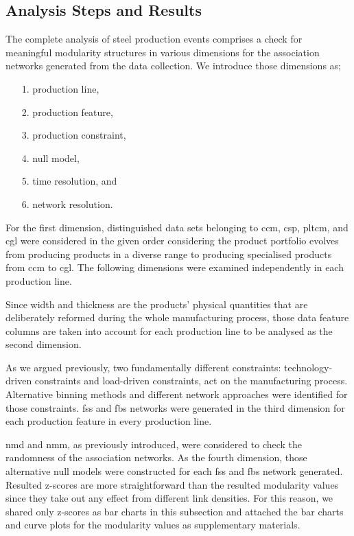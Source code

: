 \subsection{Analysis Steps and Results}

The complete analysis of steel production events comprises a check for meaningful modularity structures in various dimensions for the association networks generated from the data collection. We introduce those dimensions as;
\begin{itemize}
	\item[1.] production line,
	\item[2.] production feature,
	\item[3.] production constraint,
	\item[4.] null model,
	\item[5.] time resolution, and
	\item[6.] network resolution.
\end{itemize} 
For the first dimension, distinguished data sets belonging to \acs{ccm}, \acs{csp}, \acs{pltcm}, and \acs{cgl} were considered in the given order considering the product portfolio evolves from producing products in a diverse range to producing specialised products from \acs{ccm} to \acs{cgl}. The following dimensions were examined independently in each production line.

Since width and thickness are the products' physical quantities that are deliberately reformed during the whole manufacturing process, those data feature columns are taken into account for each production line to be analysed as the second dimension. 

As we argued previously, two fundamentally different constraints: technology-driven constraints and load-driven constraints, act on the manufacturing process. Alternative binning methods and different network approaches were identified for those constraints. \acs{fss} and \acs{fbs} networks were generated in the third dimension for each production feature in every production line.

\acs{nmd} and \acs{nmm}, as previously introduced, were considered to check the randomness of the association networks. As the fourth dimension, those alternative null models were constructed for each \acs{fss} and \acs{fbs} network generated. Resulted z-scores are more straightforward than the resulted modularity values since they take out any effect from different link densities. For this reason, we shared only z-scores as bar charts in this subsection and attached the bar charts and curve plots for the modularity values as supplementary materials.

